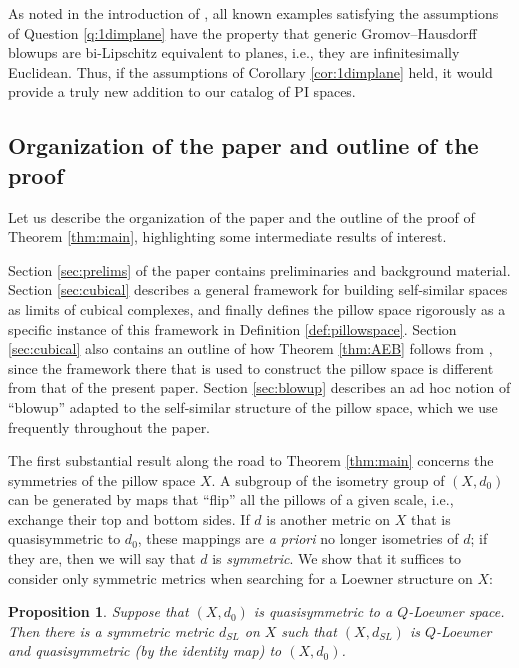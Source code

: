 \documentclass{amsart}
\theoremstyle{plain}
\newtheorem{proposition}[theorem]{Proposition}
\theoremstyle{definition}
\numberwithin{equation}{section}
\numberwithin{theorem}{section}
\begin{document}
As noted in the introduction of \cite{DavidKleiner}, all known examples satisfying the assumptions of Question \ref{q:1dimplane} have the property that generic Gromov--Hausdorff blowups are bi-Lipschitz equivalent to planes, i.e., they are infinitesimally Euclidean. Thus, if the assumptions of Corollary \ref{cor:1dimplane} held, it would provide a truly new addition to our catalog of PI spaces.

\subsection{Organization of the paper and outline of the proof}
Let us describe the organization of the paper and the outline of the proof of Theorem \ref{thm:main}, highlighting some intermediate results of interest.

Section \ref{sec:prelims} of the paper contains preliminaries and background material. Section \ref{sec:cubical} describes a general framework for building self-similar spaces as limits of cubical complexes, and finally defines the pillow space rigorously as a specific instance of this framework in Definition \ref{def:pillowspace}. Section \ref{sec:cubical} also contains an outline of how Theorem \ref{thm:AEB} follows from \cite{AEBb}, since the framework there that is used to construct the pillow space is different from that of the present paper. Section \ref{sec:blowup} describes an ad hoc notion of ``blowup'' adapted to the self-similar structure of the pillow space, which we use frequently throughout the paper.

The first substantial result along the road to Theorem \ref{thm:main} concerns the symmetries of the pillow space $X$. A subgroup of the isometry group of $(X,d_0)$ can be generated by maps that ``flip'' all the pillows of a given scale, i.e., exchange their top and bottom sides. If $d$ is another metric on $X$ that is quasisymmetric to $d_0$, these mappings are \textit{a priori} no longer isometries of $d$; if they are, then we will say that $d$ is \emph{symmetric}. We show that it suffices to consider only symmetric metrics when searching for a Loewner structure on $X$:

\begin{proposition}\label{prop:SL}
Suppose that $(X,d_0)$ is quasisymmetric to a $Q$-Loewner space. Then there is a symmetric metric $d_{SL}$ on $X$ such that $(X,d_{SL})$ is $Q$-Loewner and quasisymmetric (by the identity map) to $(X,d_0)$.
\end{proposition}
\end{document}
